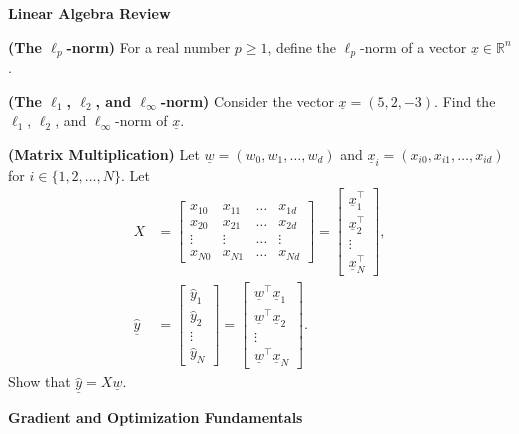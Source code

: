 \documentclass{article}
\renewcommand{\vec}[1]{\underline{#1}}
\newcommand{\vecw}{\vec{w}}
\newcommand{\vecx}{\vec{x}}
\theoremstyle{definition}
\begin{document}
\begin{question}[start=0]
	\item \textbf{Linear Algebra Review}
	\begin{question}
		\item \textbf{(The \( \ell_p \)-norm)} For a real number \( p \geq 1 \), define the \( \ell_p \)-norm of a vector \( \vec{x} \in \mathbb{R}^n \).
		\item \textbf{(The \( \ell_1 \), \( \ell_2 \), and \( \ell_\infty \)-norm)} Consider the vector $\vecx = (5,2,-3)$. Find the \( \ell_1 \), \( \ell_2 \), and \( \ell_\infty \)-norm of $\vecx$.
		\item \textbf{(Matrix Multiplication)} Let $\vecw=(w_0, w_1, \ldots, w_d)$ and $\vec{x}_i=(x_{i0}, x_{i1}, \ldots, x_{id})$ for $i \in \{1, 2, \ldots, N\}$. Let   
		\begin{align*}
			X &= \begin{bmatrix}
				x_{10} & x_{11} & \dots & x_{1d} \\
				x_{20} & x_{21} & \dots & x_{2d} \\
				\vdots & \vdots & \dots & \vdots \\
				x_{N0} & x_{N1} & \dots & x_{Nd}
			\end{bmatrix}=\begin{bmatrix}
				\vecx_{1}^\top \\
				\vecx_{2}^\top \\
				\vdots \\
				\vecx_{N}^\top
			\end{bmatrix},\\
			\vec{\hat{y}} &= \begin{bmatrix}
				\hat{y}_1 \\
				\hat{y}_2 \\
				\vdots \\
				\hat{y}_N
			\end{bmatrix} = \begin{bmatrix}
				\vecw^\top \vecx_{1} \\
				\vecw^\top \vecx_{2} \\
				\vdots \\
				\vecw^\top \vecx_{N}
			\end{bmatrix}.
		\end{align*}
		Show that $\underline{\hat{y}} = X\vecw$.
	\end{question}
	\item \textbf{Gradient and Optimization Fundamentals}\\
	\begin{question}

\end{question}
\end{question}
\end{document}
